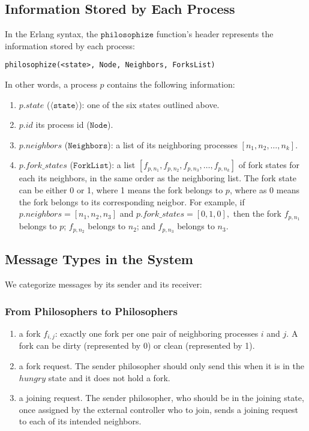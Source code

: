 \documentclass[11pt]{article}
\begin{document}
\subsection{Information Stored by Each Process}
In the Erlang syntax, the $\texttt{philosophize}$ function's header represents
the information stored by each process:
\begin{lstlisting}
philosophize(<state>, Node, Neighbors, ForksList)
\end{lstlisting}
In other words, a process $p$ contains the following information:
\begin{enumerate}
\item $p.state$ ($\langle\texttt{state}\rangle$): one of the six states outlined above.
\item $p.id$ its process id ($\texttt{Node}$).
\item $p.neighbors$ ($\texttt{Neighbors}$): a list of its neighboring processes $[n_1, n_2, \ldots, n_k]$.
\item $p.fork\_states$ ($\texttt{ForkList}$): a list $[f_{p, n_1}, f_{p, n_2}, f_{p, n_3}, \ldots, f_{p, n_k}]$ of fork states for each its neighbors, in the same order as the neighboring list. The fork state can be either 0 or 1, where 1 means the fork belongs to $p$, where as 0 means the fork belongs to its corresponding neigbor. For example, if $p.neighbors = [n_1, n_2, n_3]$ and $p.fork\_states = [0, 1, 0],$ then the fork $f_{p, n_1}$ belongs to $p$; $f_{p, n_2}$ belongs to $n_2$;
and $f_{p, n_3}$ belongs to $n_3$.
\end{enumerate}

\subsection{Message Types in the System}
We categorize messages by its sender and its receiver:
\subsubsection{From Philosophers to Philosophers}
\begin{enumerate}
\item a fork $f_{i,j}$: exactly one fork per one pair of neighboring processes $i$ and $j$. A fork can be dirty (represented by 0) or clean (represented by 1).
\item a fork request. The sender philosopher should only send this when it is in the $hungry$ state and it does not hold a fork.
\item a joining request. The sender philosopher, who should be in the joining state, once assigned by the external controller who to join, sends a joining request to each of its intended neighbors.
\end{enumerate}
\end{document}
